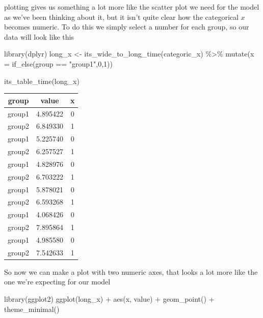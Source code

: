 \documentclass[
]{book}
\newenvironment{Shaded}{\begin{snugshade}}{\end{snugshade}}
\newcommand{\AttributeTok}[1]{\textcolor[rgb]{0.77,0.63,0.00}{#1}}
\newcommand{\DecValTok}[1]{\textcolor[rgb]{0.00,0.00,0.81}{#1}}
\newcommand{\FunctionTok}[1]{\textcolor[rgb]{0.00,0.00,0.00}{#1}}
\newcommand{\NormalTok}[1]{#1}
\newcommand{\OtherTok}[1]{\textcolor[rgb]{0.56,0.35,0.01}{#1}}
\newcommand{\SpecialCharTok}[1]{\textcolor[rgb]{0.00,0.00,0.00}{#1}}
\newcommand{\StringTok}[1]{\textcolor[rgb]{0.31,0.60,0.02}{#1}}
\begin{document}
plotting gives us something a lot more like the scatter plot we need for the model as we've been thinking about it, but it isn't quite clear how the categorical \(x\) becomes numeric. To do this we simply select a number for each group, so our data will look like this

\begin{Shaded}
\begin{Highlighting}[]
\FunctionTok{library}\NormalTok{(dplyr)}
\NormalTok{long\_x }\OtherTok{\textless{}{-}} \FunctionTok{its\_wide\_to\_long\_time}\NormalTok{(categoric\_x) }\SpecialCharTok{\%\textgreater{}\%} 
  \FunctionTok{mutate}\NormalTok{(}\AttributeTok{x =} \FunctionTok{if\_else}\NormalTok{(group }\SpecialCharTok{==} \StringTok{"group1"}\NormalTok{,}\DecValTok{0}\NormalTok{,}\DecValTok{1}\NormalTok{))}

\FunctionTok{its\_table\_time}\NormalTok{(long\_x)}
\end{Highlighting}
\end{Shaded}

\begin{tabular}{c|c|c}
\hline
group & value & x\\
\hline
group1 & 4.895422 & 0\\
\hline
group2 & 6.849330 & 1\\
\hline
group1 & 5.225740 & 0\\
\hline
group2 & 6.257527 & 1\\
\hline
group1 & 4.828976 & 0\\
\hline
group2 & 6.703222 & 1\\
\hline
group1 & 5.878021 & 0\\
\hline
group2 & 6.593268 & 1\\
\hline
group1 & 4.068426 & 0\\
\hline
group2 & 7.895864 & 1\\
\hline
group1 & 4.985580 & 0\\
\hline
group2 & 7.542633 & 1\\
\hline
\end{tabular}

So now we can make a plot with two numeric axes, that looks a lot more like the one we're expecting for our model

\begin{Shaded}
\begin{Highlighting}[]
\FunctionTok{library}\NormalTok{(ggplot2)}
  \FunctionTok{ggplot}\NormalTok{(long\_x) }\SpecialCharTok{+} \FunctionTok{aes}\NormalTok{(x, value) }\SpecialCharTok{+} \FunctionTok{geom\_point}\NormalTok{() }\SpecialCharTok{+} \FunctionTok{theme\_minimal}\NormalTok{() }
\end{Highlighting}
\end{Shaded}
\end{document}
